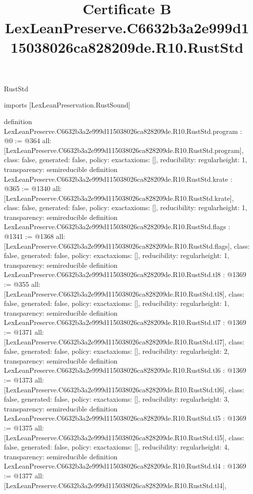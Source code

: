 \begin{lexlean}{RustStd}
\title{Certificate B LexLeanPreserve.C6632b3a2e999d115038026ca828209de.R10.RustStd}
\begin{coremodule}
imports [LexLeanPreservation.RustSound]

definition LexLeanPreserve.C6632b3a2e999d115038026ca828209de.R10.RustStd.program : @0 := @364 {
  all: [LexLeanPreserve.C6632b3a2e999d115038026ca828209de.R10.RustStd.program],
  class: false,
  generated: false,
  policy: exact{axioms: []},
  reducibility: regular{height: 1},
  transparency: semireducible
}
definition LexLeanPreserve.C6632b3a2e999d115038026ca828209de.R10.RustStd.krate : @365 := @1340 {
  all: [LexLeanPreserve.C6632b3a2e999d115038026ca828209de.R10.RustStd.krate],
  class: false,
  generated: false,
  policy: exact{axioms: []},
  reducibility: regular{height: 1},
  transparency: semireducible
}
definition LexLeanPreserve.C6632b3a2e999d115038026ca828209de.R10.RustStd.flags : @1341 := @1368 {
  all: [LexLeanPreserve.C6632b3a2e999d115038026ca828209de.R10.RustStd.flags],
  class: false,
  generated: false,
  policy: exact{axioms: []},
  reducibility: regular{height: 1},
  transparency: semireducible
}
definition LexLeanPreserve.C6632b3a2e999d115038026ca828209de.R10.RustStd.tl8 : @1369 := @355 {
  all: [LexLeanPreserve.C6632b3a2e999d115038026ca828209de.R10.RustStd.tl8],
  class: false,
  generated: false,
  policy: exact{axioms: []},
  reducibility: regular{height: 1},
  transparency: semireducible
}
definition LexLeanPreserve.C6632b3a2e999d115038026ca828209de.R10.RustStd.tl7 : @1369 := @1371 {
  all: [LexLeanPreserve.C6632b3a2e999d115038026ca828209de.R10.RustStd.tl7],
  class: false,
  generated: false,
  policy: exact{axioms: []},
  reducibility: regular{height: 2},
  transparency: semireducible
}
definition LexLeanPreserve.C6632b3a2e999d115038026ca828209de.R10.RustStd.tl6 : @1369 := @1373 {
  all: [LexLeanPreserve.C6632b3a2e999d115038026ca828209de.R10.RustStd.tl6],
  class: false,
  generated: false,
  policy: exact{axioms: []},
  reducibility: regular{height: 3},
  transparency: semireducible
}
definition LexLeanPreserve.C6632b3a2e999d115038026ca828209de.R10.RustStd.tl5 : @1369 := @1375 {
  all: [LexLeanPreserve.C6632b3a2e999d115038026ca828209de.R10.RustStd.tl5],
  class: false,
  generated: false,
  policy: exact{axioms: []},
  reducibility: regular{height: 4},
  transparency: semireducible
}
definition LexLeanPreserve.C6632b3a2e999d115038026ca828209de.R10.RustStd.tl4 : @1369 := @1377 {
  all: [LexLeanPreserve.C6632b3a2e999d115038026ca828209de.R10.RustStd.tl4],
}
\end{coremodule}
\end{lexlean}
